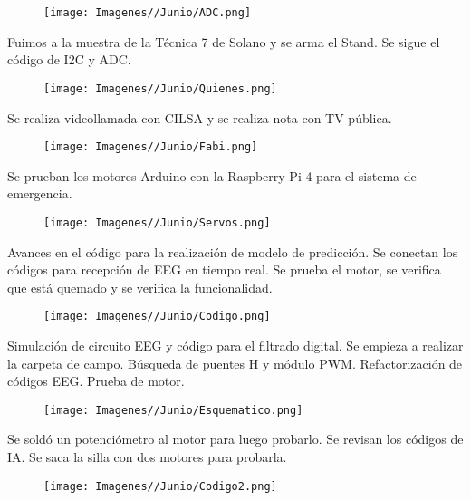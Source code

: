 \documentclass{article}
\begin{document}
\begin{figure}[H]
    \centering
    \texttt{[image: Imagenes//Junio/ADC.png]}
\end{figure}

\newpage

Fuimos a la muestra de la Técnica 7 de Solano y se arma el Stand. Se sigue el código de I2C y ADC.

\begin{figure}[H]
    \centering
    \texttt{[image: Imagenes//Junio/Quienes.png]}
\end{figure}

Se realiza videollamada con CILSA y se realiza nota con TV pública.

\begin{figure}[H]
    \centering
    \texttt{[image: Imagenes//Junio/Fabi.png]}
\end{figure}

Se prueban los motores Arduino con la Raspberry Pi 4 para el sistema de emergencia.

\begin{figure}[H]
    \centering
    \texttt{[image: Imagenes//Junio/Servos.png]}
\end{figure}


Avances en el código para la realización de modelo de predicción. Se conectan los códigos para recepción de EEG en tiempo real. Se prueba el motor, se verifica que está quemado y se verifica la funcionalidad.

\begin{figure}[H]
    \centering
    \texttt{[image: Imagenes//Junio/Codigo.png]}
\end{figure}


Simulación de circuito EEG y código para el filtrado digital. Se empieza a realizar la carpeta de campo. Búsqueda de puentes H y módulo PWM. Refactorización de códigos EEG. Prueba de motor.

\begin{figure}[H]
    \centering
    \texttt{[image: Imagenes//Junio/Esquematico.png]}
\end{figure}


Se soldó un potenciómetro al motor para luego probarlo. Se revisan los códigos de IA. Se saca la silla con dos motores para probarla.

\begin{figure}[H]
    \centering
    \texttt{[image: Imagenes//Junio/Codigo2.png]}
\end{figure}
\end{document}
